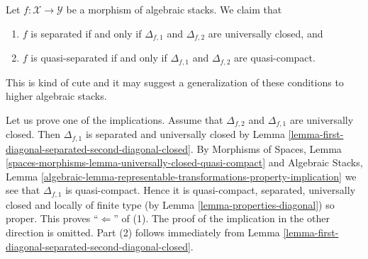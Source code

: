 \begin{remark}
\label{remark-definition-separated}
Let $f : \mathcal{X} \to \mathcal{Y}$ be a morphism of algebraic stacks.
We claim that
\begin{enumerate}
\item $f$ is separated if and only if $\Delta_{f, 1}$ and $\Delta_{f, 2}$
are universally closed, and
\item $f$ is quasi-separated if and only if $\Delta_{f, 1}$ and $\Delta_{f, 2}$
are quasi-compact.
\end{enumerate}
This is kind of cute and it may suggest a generalization of these conditions
to higher algebraic stacks.

\medskip\noindent
Let us prove one of the implications.
Assume that $\Delta_{f, 2}$ and $\Delta_{f, 1}$
are universally closed. Then $\Delta_{f, 1}$ is separated and universally
closed by
Lemma \ref{lemma-first-diagonal-separated-second-diagonal-closed}.
By
Morphisms of Spaces,
Lemma \ref{spaces-morphisms-lemma-universally-closed-quasi-compact}
and
Algebraic Stacks,
Lemma \ref{algebraic-lemma-representable-transformations-property-implication}
we see that $\Delta_{f, 1}$ is quasi-compact.
Hence it is quasi-compact, separated, universally closed and locally of
finite type (by
Lemma \ref{lemma-properties-diagonal})
so proper. This proves ``$\Leftarrow$'' of (1).
The proof of the implication in the other direction is omitted.
Part (2) follows immediately from
Lemma \ref{lemma-first-diagonal-separated-second-diagonal-closed}.
\end{remark}













